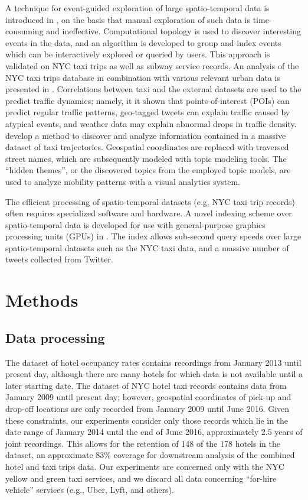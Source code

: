 \documentclass[useAMS, usenatbib]{biom}
\begin{document}
A technique for event-guided exploration of large spatio-temporal data is introduced in \citet{Doraiswamy2014UsingTA}, on the basis that manual exploration of such data is time-consuming and ineffective. Computational topology is used to discover interesting events in the data, and an algorithm is developed to group and index events which can be interactively explored or queried by users. This approach is validated on NYC taxi trips as well as subway service records. An analysis of the NYC taxi trips database in combination with various relevant urban data is presented in \citet{Wu2016InterpretingTD}. Correlations between taxi and the external datasets are used to the predict traffic dynamics; namely, it it shown that points-of-interest (POIs) can predict regular traffic patterns, geo-tagged tweets can explain traffic caused by atypical events, and weather data may explain abnormal drops in traffic density. \citet{Chu2014VisualizingHT} develop a method to discover and analyze information contained in a massive dataset of taxi trajectories. Geospatial coordinates are replaced with traversed street names, which are subsequently modeled with topic modeling tools. The ``hidden themes'', or the discovered topics from the employed topic models, are used to analyze mobility patterns with a visual analytics system. 

The efficient processing of spatio-temporal datasets (e.g, NYC taxi trip records) often requires specialized software and hardware. A novel indexing scheme over spatio-temporal data is developed for use with general-purpose graphics processing units (GPUs) in \citet{Doraiswamy2016AGI}. The index allows sub-second query speeds over large spatio-temporal datasets such as the NYC taxi data, and a massive number of tweets collected from Twitter.

\section{Methods}
\label{s:methods}

\subsection{Data processing}

The dataset of hotel occupancy rates contains recordings from January 2013 until present day, although there are many hotels for which data is not available until a later starting date. The dataset of NYC hotel taxi records contains data from January 2009 until present day; however, geospatial coordinates of pick-up and drop-off locations are only recorded from January 2009 until June 2016. Given these constraints, our experiments consider only those records which lie in the date range of January 2014 until the end of June 2016, approximately 2.5 years of joint recordings. This allows for the retention of 148 of the 178 hotels in the dataset, an approximate 83\% coverage for downstream analysis of the combined hotel and taxi trips data. Our experiments are concerned only with the NYC yellow and green taxi services, and we discard all data concerning ``for-hire vehicle'' services (e.g., Uber, Lyft, and others).
\end{document}

